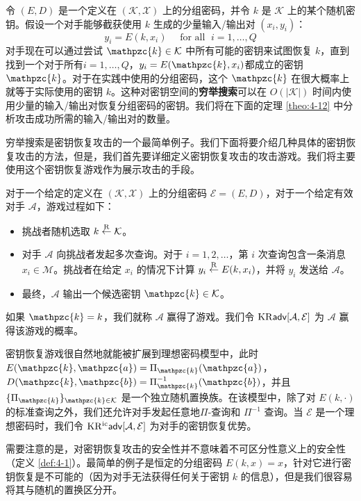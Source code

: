 令 $(E, D)$ 是一个定义在 $(\mathcal{K},\mathcal{X})$ 上的分组密码，并令 $k$ 是 $\mathcal{K}$ 上的某个随机密钥。假设一个对手能够截获使用 $k$ 生成的少量输入/输出对 $(x_i,y_i)$：
\[
y_i=E(k,x_i)
\quad\text{ for all }\;
i=1,\dots,Q
\]
对手现在可以通过尝试 $\mathpzc{k}\in\mathcal{K}$ 中所有可能的密钥来试图恢复 $k$，直到找到一个对于所有$i=1,\dots,Q$，$y_i=E(\mathpzc{k},x_i)$都成立的密钥 $\mathpzc{k}$。对于在实践中使用的分组密码，这个 $\mathpzc{k}$ 在很大概率上就等于实际使用的密钥 $k$。这种对密钥空间的\textbf{穷举搜索}可以在 $O(|\mathcal{K}|)$ 时间内使用少量的输入/输出对恢复分组密码的密钥。我们将在下面的定理 \ref{theo:4-12} 中分析攻击成功所需的输入/输出对的数量。

穷举搜索是密钥恢复攻击的一个最简单例子。我们下面将要介绍几种具体的密钥恢复攻击的方法，但是，我们首先要详细定义密钥恢复攻击的攻击游戏。我们将主要使用这个密钥恢复游戏作为展示攻击的手段。

\begin{game}\label{game:4-4}
对于一个给定的定义在 $(\mathcal{K},\mathcal{X})$ 上的分组密码 $\mathcal{E}=(E,D)$，对于一个给定有效对手 $\mathcal{A}$，游戏过程如下：
\begin{itemize}
	\item 挑战者随机选取 $k\overset{\rm R}\leftarrow\mathcal{K}$。
	\item 对手 $\mathcal{A}$ 向挑战者发起多次查询。对于 $i=1,2,\dots$，第 $i$ 次查询包含一条消息 $x_i\in\mathcal{M}$。挑战者在给定 $x_i$ 的情况下计算 $y_i\overset{\rm R}\leftarrow E(k,x_i)$，并将 $y_i$ 发送给 $\mathcal{A}$。
	\item 最终，$\mathcal{A}$ 输出一个候选密钥 $\mathpzc{k}\in\mathcal{K}$。
\end{itemize}
如果 $\mathpzc{k}=k$，我们就称 $\mathcal{A}$ 赢得了游戏。我们令 $\rm{KR}\mathsf{adv}[\mathcal{A},\mathcal{E}]$ 为 $\mathcal{A}$ 赢得该游戏的概率。
\end{game}

密钥恢复游戏很自然地就能被扩展到理想密码模型中，此时 $E(\mathpzc{k},\mathpzc{a})=\Pi_\mathpzc{k}(\mathpzc{a})$，$D(\mathpzc{k},\mathpzc{b})=\Pi^{-1}_\mathpzc{k}(\mathpzc{b})$，并且 $\{\Pi_\mathpzc{k}\}_{\mathpzc{k}\in\mathcal{K}}$ 是一个独立随机置换族。在该模型中，除了对 $E(k,\cdot)$ 的标准查询之外，我们还允许对手发起任意地$\Pi$-查询和 $\Pi^{-1}$ 查询。当 $\mathcal{E}$ 是一个理想密码时，我们令 $\rm{KR^{ic}}\mathsf{adv}[\mathcal{A},\mathcal{E}]$ 为对手的密钥恢复优势。

需要注意的是，对密钥恢复攻击的安全性并不意味着不可区分性意义上的安全性（定义 \ref{def:4-1}）。最简单的例子是恒定的分组密码 $E(k,x)=x$，针对它进行密钥恢复是不可能的（因为对手无法获得任何关于密钥 $k$ 的信息），但是我们很容易将其与随机的置换区分开。


